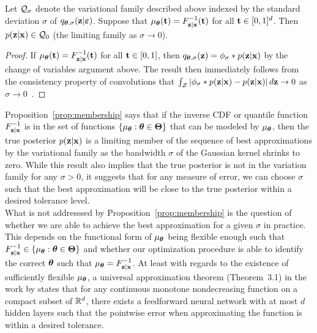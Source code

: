 \documentclass[10pt]{article}
\begin{document}
\begin{proposition} \label{prop:membership}
Let $\mathcal{Q}_\sigma$ denote the variational family described above indexed by the standard deviation $\sigma$ of $q_{{\bm{\theta}},\sigma}(\mathbf{z}|\bm{\varepsilon})$. Suppose that $\mu_{\bm{\theta}}(\mathbf{t})=F_{\mathbf{z}|\mathbf{x}}^{-1}(\mathbf{t})$ for all $\mathbf{t}\in[0,1]^d$. Then $p(\mathbf{z}|\mathbf{x})\in\mathcal{Q}_0$ (the limiting family as $\sigma\rightarrow0$).
\end{proposition}
\begin{proof}
If $\mu_{\bm{\theta}}(\mathbf{t})=F_{\mathbf{z}|\mathbf{x}}^{-1}(\mathbf{t})$ for all $\mathbf{t}\in[0,1]$, then $q_{{\bm{\theta}},\sigma}(\mathbf{z}) = \phi_\sigma*p(\mathbf{z}|\mathbf{x})$ by the change of variables argument above. The result then immediately follows from the consistency property of convolutions that $\int_{\mathcal{Z}}\left|\phi_\sigma*p(\mathbf{z}|\mathbf{x}) - p(\mathbf{z}|\mathbf{x})\right|d\mathbf{z}\rightarrow0$ as $\sigma\rightarrow0$~\citep{Devroye:2001}.
\end{proof}

Proposition~\ref{prop:membership} says that if the inverse CDF or quantile function $F_{\mathbf{z}|\mathbf{x}}^{-1}$ is in the set of functions $\{\mu_{\bm{\theta}}:{\bm{\theta}}\in{\bm\Theta}\}$ that can be modeled by $\mu_{\bm{\theta}}$, then the true posterior $p(\mathbf{z}|\mathbf{x})$ is a limiting member of the sequence of best approximations by the variational family as the bandwidth $\sigma$ of the Gaussian kernel shrinks to zero. While this result also implies that the true posterior is not in the variation family for any $\sigma>0$, it suggests that for any measure of error, we can choose $\sigma$ such that the best approximation will be close to the true posterior within a desired tolerance level.
\\

What is not addresssed by Proposition~\ref{prop:membership} is the question of whether we are able to achieve the best approximation for a given $\sigma$ in practice. This depends on the functional form of $\mu_{\bm{\theta}}$ being flexible enough such that $F_{\mathbf{z}|\mathbf{x}}^{-1}\in\{\mu_{\bm{\theta}}:{\bm{\theta}}\in{\bm\Theta}\}$ and whether our optimization procedure is able to identify the correct ${\bm{\theta}}$ such that $\mu_{\bm{\theta}}=F_{\mathbf{z}|\mathbf{x}}^{-1}$. At least with regards to the existence of sufficiently flexible $\mu_{\bm{\theta}}$, a universal approximation theorem (Theorem~3.1) in the work by \citet{Daniels:2010} states that for any continuous monotone nondecreasing function on a compact subset of $\mathbb{R}^d$, there exists a feedforward neural network with at most $d$ hidden layers such that the pointwise error when approximating the function is within a desired tolerance.
\\
\end{document}
